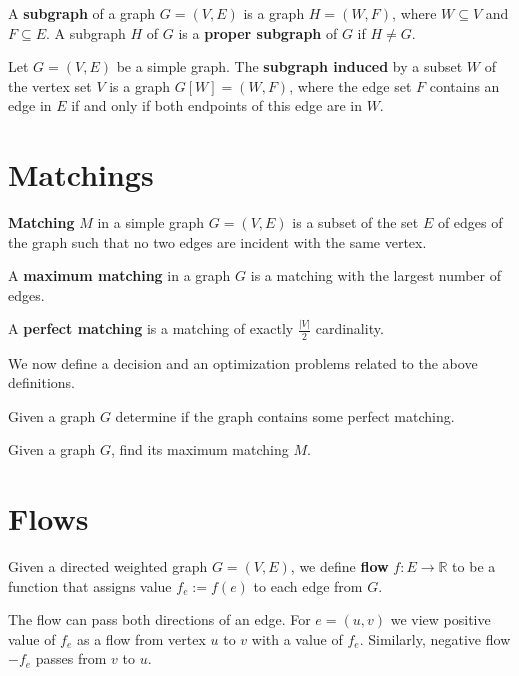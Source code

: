 \begin{definition}
A \textbf{subgraph} of a graph $G=(V,E)$ is a graph $H=(W,F)$, where $W\subseteq V$ and $F\subseteq E$. A subgraph $H$ of $G$ is a \textbf{proper subgraph} of $G$ if $H\not=G$.
\end{definition}

\begin{definition}
Let $G=(V,E)$ be a simple graph. The \textbf{subgraph induced} by a subset $W$ of the vertex set $V$ is a graph $G[W]=(W,F)$, where the edge set $F$ contains an edge in $E$ if and only if both endpoints of this edge are in $W$.
\end{definition}

\section{Matchings}
\begin{definition}
\textbf{Matching} $M$ in a simple graph $G=(V,E)$ is a subset of the set $E$ of edges of the graph such that no two edges are incident with the same vertex.
\end{definition}

\begin{definition}
A \textbf{maximum matching} in a graph $G$ is a matching with the largest number of edges.
\end{definition}

\begin{definition}
A \textbf{perfect matching} is a matching of exactly $\frac{|V|}{2}$ cardinality.
\end{definition}

We now define a decision and an optimization problems related to the above definitions.
\begin{problem}
Given a graph $G$ determine if the graph contains some perfect matching.
\end{problem}

\begin{problem}
Given a graph $G$, find its maximum matching $M$.
\end{problem}

\section{Flows}
\begin{definition}
Given a directed weighted graph $G=(V,E)$, we define \textbf{flow} $f:E\rightarrow\mathbb{R}$ to be a function that assigns value $f_e:=f(e)$ to each edge from $G$.

The flow can pass both directions of an edge. For $e=(u,v)$ we view positive value of $f_e$ as a flow from vertex $u$ to $v$ with a value of $f_e$. Similarly, negative flow $-f_e$ passes from $v$ to $u$.
\end{definition}

